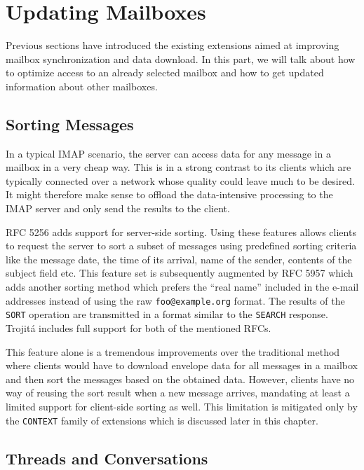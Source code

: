 \documentclass[trojita]{subfiles}
\begin{document}
\section{Updating Mailboxes}

Previous sections have introduced the existing extensions aimed at improving mailbox synchronization and data download.
In this part, we will talk about how to optimize access to an already selected mailbox and how to get updated
information about other mailboxes.

\subsection{Sorting Messages}

In a typical IMAP scenario, the server can access data for any message in a mailbox in a very cheap way.  This is in a
strong contrast to its clients which are typically connected over a network whose quality could leave much to be
desired.  It might therefore make sense to offload the data-intensive processing to the IMAP server and only send the
results to the client.

RFC 5256 \cite{rfc5256} adds support for server-side sorting.  Using these features allows clients to request the server
to sort a subset of messages using predefined sorting criteria like the message date, the time of its arrival, name of
the sender, contents of the subject field etc.  This feature set is subsequently augmented by RFC 5957 \cite{rfc5957}
which adds another sorting method which prefers the ``real name'' included in the e-mail addresses instead of using the
raw {\tt foo@example.org} format.  The results of the {\tt SORT} operation are transmitted in a format similar to the
{\tt SEARCH} response.  Trojitá includes full support for both of the mentioned RFCs.

This feature alone is a tremendous improvements over the traditional method where clients would have to download
envelope data for all messages in a mailbox and then sort the messages based on the obtained data.  However, clients
have no way of reusing the sort result when a new message arrives, mandating at least a limited support for client-side
sorting as well.  This limitation is mitigated only by the {\tt CONTEXT} family of extensions which is discussed later
in this chapter.

\subsection{Threads and Conversations}
\end{document}
